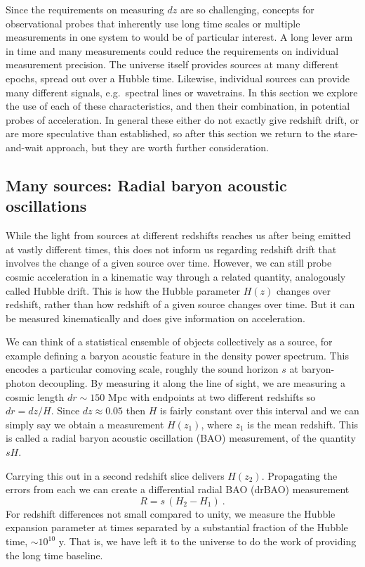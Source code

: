 \documentclass[preprint2, 10pt]{aastex}
\newcommand{\be}{\begin{equation}}
\newcommand{\ee}{\end{equation}}
\begin{document}
Since the requirements on measuring $dz$ are so challenging, 
concepts for observational probes that inherently use long time scales or 
multiple measurements in one system to  would be of particular interest. 
A long lever arm in time and many measurements could reduce the requirements 
on individual measurement precision.  The universe itself provides sources 
at many different epochs, spread out over a Hubble time.  Likewise, 
individual sources can provide many different signals, e.g.\ spectral lines 
or wavetrains.  In this section we explore the use of each of these 
characteristics, and then their combination, in potential probes of 
acceleration. In general these either do not exactly give redshift drift, 
or are more speculative than established, so after this section we return 
to the stare-and-wait approach, but they are worth further consideration. 


\subsection{Many sources: Radial baryon acoustic oscillations} \label{sec:rbao} 

While the light from sources at different redshifts reaches us after 
being emitted at vastly different times, this does not inform us regarding 
redshift drift that involves the change of a given source over time.  
However, we can still probe cosmic acceleration in a kinematic way through 
a related quantity, analogously called Hubble drift. This is how the Hubble 
parameter $H(z)$ changes over redshift, rather than how redshift of a given 
source changes over time. But it can be measured kinematically and does 
give information on acceleration. 

We can think of a statistical ensemble of objects collectively as 
a source, for example 
defining a baryon acoustic feature in the density power spectrum.  This 
encodes a particular comoving scale, roughly the sound horizon $s$ at 
baryon-photon decoupling.  By measuring it along the line of sight, we 
are measuring a cosmic length $dr\sim150$ Mpc with endpoints at two 
different redshifts so $dr=dz/H$.  Since $dz\approx0.05$ then $H$ is 
fairly constant over this interval and we can simply say we obtain a 
measurement $H(z_1)$, where $z_1$ is the mean redshift.  This is called a 
radial baryon acoustic oscillation (BAO) measurement, of the quantity 
$sH$. 

Carrying this out in a second redshift slice delivers $H(z_2)$.  Propagating 
the errors from each we can create a differential radial BAO (drBAO) 
measurement 
\be 
R=s\,(H_2-H_1) \ . \label{eq:drbao} 
\ee 
For redshift differences not small compared to unity, we measure the 
Hubble expansion parameter at times separated by a substantial fraction 
of the Hubble time, $\sim10^{10}$ y.  That is, we have left it to the universe 
to do the work of providing the long time baseline.  
\end{document}

